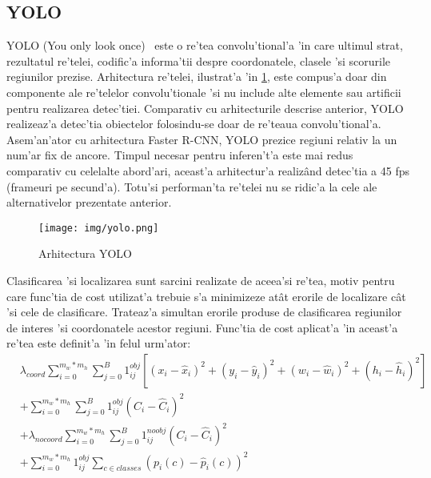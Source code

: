 \documentclass[12pt,a4paper,twoside]{report}
\begin{document}
\subsection{YOLO}
\label{ch:yolo}
YOLO (You only look once)~\cite{YOLO} este o re'tea convolu'tional'a 'in care ultimul strat, rezultatul re'telei, codific'a informa'tii despre coordonatele, clasele 'si scorurile regiunilor prezise. Arhitectura re'telei, ilustrat'a 'in \ref{fig:yolo_arhitecture}, este compus'a doar din componente ale re'telelor convolu'tionale 'si nu include alte elemente sau artificii pentru realizarea detec'tiei. Comparativ cu arhitecturile descrise anterior, YOLO realizeaz'a detec'tia obiectelor folosindu-se doar de re'teaua convolu'tional'a. Asem'an'ator cu arhitectura Faster R-CNN, YOLO prezice regiuni relativ la un num'ar fix de ancore. Timpul necesar pentru inferen't'a este mai redus comparativ cu celelalte abord'ari, aceast'a arhitectur'a realiz\^and detec'tia a 45 fps (frameuri pe secund'a). Totu'si performan'ta re'telei nu se ridic'a la cele ale alternativelor prezentate anterior.

\begin{figure}[H]
  \texttt{[image: img/yolo.png]}
  \centering
  \caption{Arhitectura YOLO\protect\footnotemark}
  \label{fig:yolo_arhitecture}
\end{figure}

Clasificarea 'si localizarea sunt sarcini realizate de aceea'si re'tea, motiv pentru care func'tia de cost utilizat'a trebuie s'a minimizeze at\^at erorile de localizare c\^at 'si cele de clasificare. Trateaz'a simultan erorile produse de clasificarea regiunilor de interes 'si coordonatele acestor regiuni. Func'tia de cost aplicat'a 'in aceast'a re'tea este definit'a 'in felul urm'ator:
\begin{equation}
\begin{split}
& \lambda_{coord} \sum\limits_{i=0}^{m_w*m_h} \sum\limits_{j=0}^{B} 1_{ij}^{obj}[(x_i - \hat{x}_i)^2 + (y_i - \hat{y}_i)^2 + (w_i - \hat{w}_i)^2 + (h_i - \hat{h}_i)^2] \\
& + \sum\limits_{i=0}^{m_w*m_h} \sum\limits_{j=0}^{B} 1_{ij}^{obj}(C_i - \hat{C}_i)^2\\
& + \lambda_{nocoord} \sum\limits_{i=0}^{m_w*m_h} \sum\limits_{j=0}^{B} 1_{ij}^{noobj}(C_i - \hat{C}_i)^2 \\
& + \sum\limits_{i=0}^{m_w*m_h} 1_{ij}^{obj} \sum\limits_{c \in classes} (p_i(c) - \hat{p}_i(c))^2
\end{split}
\label{eq:yolo}
\end{equation}
\end{document}

